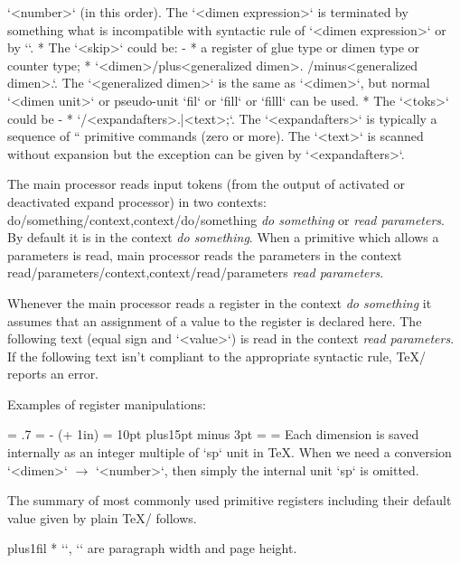 {  `<number>` (in this order). The `<dimen expression>`
  is terminated by something what is incompatible with
  syntactic rule of `<dimen expression>` or by `\relax`.
\enditems
* The `<skip>` could be:
\begitems \style -
* a register of glue type or dimen type or counter type;
* `<dimen>/plus<generalized dimen>. /minus<generalized dimen>.`. The 
  `<generalized dimen>` is the same as `<dimen>`, but normal `<dimen unit>` 
   or pseudo-unit `fil` or `fill` or `filll` can be used.
\enditems
* The `<toks>` could be
\begitems \style -
* `/<expandafters>.{|<text>};`. The `<expandafters>` is typically a sequence of
  `\expandafter` primitive commands (zero or more). The `<text>` is
  scanned without expansion but the exception can be given by 
  `<expandafters>`.
\enditems
\enditems

\removelastskip
The main processor reads input tokens (from the output of activated or
deactivated expand processor) in two contexts: 
\ii do/something/context,context/do/something {\em do something} or {\em
read parameters}. By default it is in the context {\em do something}. When a
primitive which allows a parameters is read, main processor reads the
parameters in the context \ii read/parameters/context,context/read/parameters {\em read parameters}.

Whenever the main processor reads a register in the context
{\em do something} it assumes that an assignment of a value to the register
is declared here. The following text (equal sign and `<value>`) is read in the context
{\em read parameters}. If the following text isn't
compliant to the appropriate syntactic rule, \TeX/ reports an error.

Examples of register manipulations:

\begtt
\newcount\mynumber \newdimen\mydimension \newdimen\myskip
\hsize = .7\hsize  %
\hoffset = \dimexpr 10mm - (\parindent + 1in) \relax %
\myskip = 10pt plus15pt minus 3pt
\mydimen = \myskip    %
\mynumber = \mydimen  %
\endtt
%
Each dimension is saved internally as an integer multiple of `sp` unit in
\TeX. When we need a conversion `<dimen>` $\to$ `<number>`, then simply the
internal unit `sp` is omitted.

The summary of most commonly used primitive registers including their default
value given by plain \TeX/ follows.

\begitems  \rightskip=0pt plus1fil
* \y`\hsize=6.5in`,
  \y`\vsize=8.9in`
  are paragraph width and page height.

}
